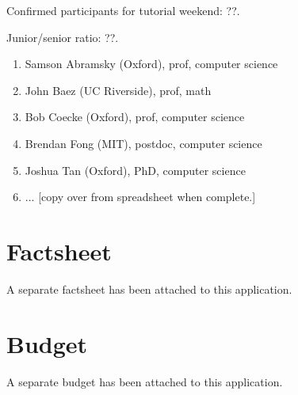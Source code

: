 \documentclass{article}
\newcommand{\redout}[1]{{\color{red}#1}}
\begin{document}
Confirmed participants for tutorial weekend: \redout{??}. 

Junior/senior ratio: \redout{??}.

\begin{enumerate}
\item Samson Abramsky (Oxford), prof, computer science
\item John Baez (UC Riverside), prof, math
\item Bob Coecke (Oxford), prof, computer science
\item Brendan Fong (MIT), postdoc, computer science
\item Joshua Tan (Oxford), PhD, computer science
\item \redout{... [copy over from spreadsheet when complete.]}
\end{enumerate}

\section{Factsheet}
A separate factsheet has been attached to this application.

\section{Budget}
A separate budget has been attached to this application.


 
\end{document}

